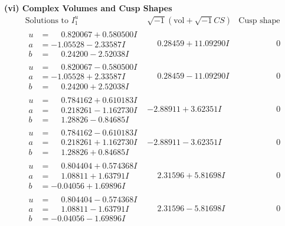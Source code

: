 \documentclass[1p]{elsarticle_modified}
\theoremstyle{definition}
\newcommand{\I}{\sqrt{-1}}
\begin{document}
\newpage\flushleft \textbf{(vi) Complex Volumes and Cusp Shapes}
$$\begin{array}{c|c|c}  
\text{Solutions to }I^u_{1}& \I (\text{vol} + \sqrt{-1}CS) & \text{Cusp shape}\\
 \hline 
\begin{aligned}
u &= \phantom{-}0.820067 + 0.580500 I \\
a &= -1.05528 - 2.33587 I \\
b &= \phantom{-}0.24200 - 2.52038 I\end{aligned}
 & \phantom{-}0.28459 + 11.09290 I & \phantom{-0.000000 } 0 \\ \hline\begin{aligned}
u &= \phantom{-}0.820067 - 0.580500 I \\
a &= -1.05528 + 2.33587 I \\
b &= \phantom{-}0.24200 + 2.52038 I\end{aligned}
 & \phantom{-}0.28459 - 11.09290 I & \phantom{-0.000000 } 0 \\ \hline\begin{aligned}
u &= \phantom{-}0.784162 + 0.610183 I \\
a &= \phantom{-}0.218261 - 1.162730 I \\
b &= \phantom{-}1.28826 - 0.84685 I\end{aligned}
 & -2.88911 + 3.62351 I & \phantom{-0.000000 } 0 \\ \hline\begin{aligned}
u &= \phantom{-}0.784162 - 0.610183 I \\
a &= \phantom{-}0.218261 + 1.162730 I \\
b &= \phantom{-}1.28826 + 0.84685 I\end{aligned}
 & -2.88911 - 3.62351 I & \phantom{-0.000000 } 0 \\ \hline\begin{aligned}
u &= \phantom{-}0.804404 + 0.574368 I \\
a &= \phantom{-}1.08811 + 1.63791 I \\
b &= -0.04056 + 1.69896 I\end{aligned}
 & \phantom{-}2.31596 + 5.81698 I & \phantom{-0.000000 } 0 \\ \hline\begin{aligned}
u &= \phantom{-}0.804404 - 0.574368 I \\
a &= \phantom{-}1.08811 - 1.63791 I \\
b &= -0.04056 - 1.69896 I\end{aligned}
 & \phantom{-}2.31596 - 5.81698 I & \phantom{-0.000000 } 0 \\ \hline\begin{aligned}

\end{aligned}
\end{array}$$
\end{document}
